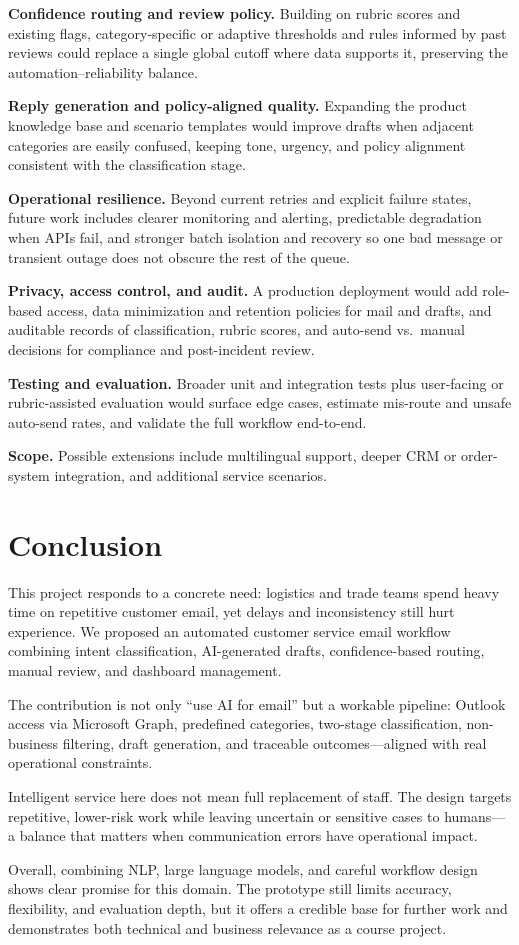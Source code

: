 \documentclass[12pt]{article}
\begin{document}
\textbf{Confidence routing and review policy.} Building on rubric scores and existing flags, category-specific or adaptive thresholds and rules informed by past reviews could replace a single global cutoff where data supports it, preserving the automation--reliability balance.

\textbf{Reply generation and policy-aligned quality.} Expanding the product knowledge base and scenario templates would improve drafts when adjacent categories are easily confused, keeping tone, urgency, and policy alignment consistent with the classification stage.

\textbf{Operational resilience.} Beyond current retries and explicit failure states, future work includes clearer monitoring and alerting, predictable degradation when APIs fail, and stronger batch isolation and recovery so one bad message or transient outage does not obscure the rest of the queue.

\textbf{Privacy, access control, and audit.} A production deployment would add role-based access, data minimization and retention policies for mail and drafts, and auditable records of classification, rubric scores, and auto-send vs.\ manual decisions for compliance and post-incident review.

\textbf{Testing and evaluation.} Broader unit and integration tests plus user-facing or rubric-assisted evaluation would surface edge cases, estimate mis-route and unsafe auto-send rates, and validate the full workflow end-to-end.

\textbf{Scope.} Possible extensions include multilingual support, deeper CRM or order-system integration, and additional service scenarios.

\section{Conclusion}

This project responds to a concrete need: logistics and trade teams spend heavy time on repetitive customer email, yet delays and inconsistency still hurt experience. We proposed an automated customer service email workflow combining intent classification, AI-generated drafts, confidence-based routing, manual review, and dashboard management.

The contribution is not only ``use AI for email'' but a workable pipeline: Outlook access via Microsoft Graph, predefined categories, two-stage classification, non-business filtering, draft generation, and traceable outcomes---aligned with real operational constraints.

Intelligent service here does not mean full replacement of staff. The design targets repetitive, lower-risk work while leaving uncertain or sensitive cases to humans---a balance that matters when communication errors have operational impact.

Overall, combining NLP, large language models, and careful workflow design shows clear promise for this domain. The prototype still limits accuracy, flexibility, and evaluation depth, but it offers a credible base for further work and demonstrates both technical and business relevance as a course project.
\end{document}
